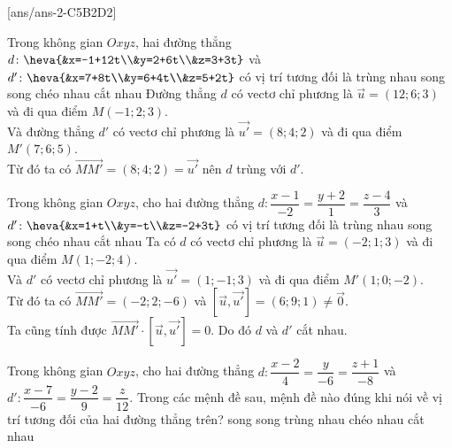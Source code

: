 [ans/ans-2-C5B2D2]
\TN
\begin{ex}%
Trong không gian $Oxyz$, hai đường thẳng $d \colon \heva{&x=-1+12t\\&y=2+6t\\&z=3+3t}$ và  $d' \colon \heva{&x=7+8t\\&y=6+4t\\&z=5+2t}$ có vị trí tương đối là
	\choice
	{\True trùng nhau}
	{song song}
	{chéo nhau}
	{cắt nhau}
	\loigiai
	{Đường thẳng $d$ có vectơ chỉ phương là  $\overrightarrow{u}=(12;6;3)$ và đi qua điểm $M(-1;2;3)$.\\
	Và đường thẳng $d'$ có vectơ chỉ phương là  $\overrightarrow{u'}=(8;4;2)$ và đi qua điểm $M'(7;6;5)$.\\
	Từ đó ta có $\overrightarrow{MM'}=(8;4;2)=\overrightarrow{u'}$ nên $d$ trùng với $d'$.}
	\end{ex}
\begin{ex}%
	Trong không gian $Oxyz$, cho hai đường thẳng $d \colon \dfrac{x-1}{-2}=\dfrac{y+2}{1}=\dfrac{z-4}{3}$ và  $ d' \colon \heva{&x=1+t\\&y=-t\\&z=-2+3t}$ có vị trí tương đối là
	\choice
	{trùng nhau}
	{song song}
	{chéo nhau}
	{\True  cắt nhau}
	\loigiai
	{Ta có 	$d$ có vectơ chỉ phương là  $\overrightarrow{u}=(-2;1;3)$ và đi qua điểm $M(1;-2;4)$.\\
		Và $d'$ có vectơ chỉ phương là  $\overrightarrow{u'}=(1;-1;3)$ và đi qua điểm $M'(1;0;-2)$.\\
		Từ đó ta có $\overrightarrow{MM'}=(-2;2;-6)$ và $ \left[\overrightarrow{u},\overrightarrow{u'} \right]=(6;9;1)\ne \overrightarrow{0}$. \\
		Ta cũng tính được $ \overrightarrow{MM'} \cdot \left[\overrightarrow{u},\overrightarrow{u'} \right]=0$. Do đó $d$ và $d'$ cắt nhau.}
\end{ex}
\begin{ex}%
	Trong không gian $Oxyz$, cho hai đường thẳng $d\colon \dfrac{x-2}{4}=\dfrac{y}{-6}=\dfrac{z+1}{-8}$ và $d'\colon \dfrac{x-7}{-6}=\dfrac{y-2}{9}=\dfrac{z}{12}$. Trong các mệnh đề sau, mệnh đề nào đúng khi nói về vị trí tương đối của hai đường thẳng trên?
	\choice
	{\True song song}
	{trùng nhau}
	c{héo nhau}
	{cắt nhau}
\end{ex}
